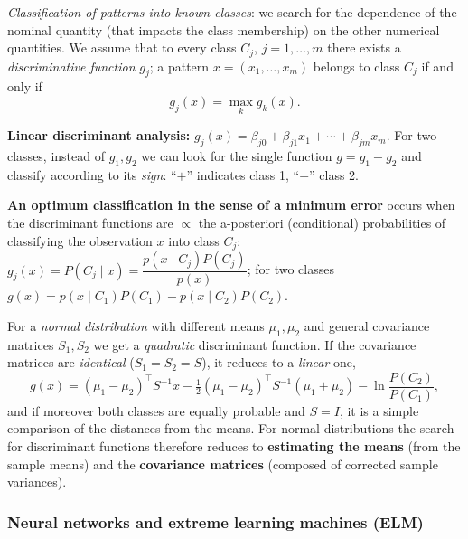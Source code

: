 \documentclass[11pt,a4paper]{article}
\theoremstyle{definition}
\providecommand{\uv}[1]{``#1''}
\begin{document}
\begin{defbox}
\emph{Classification of patterns into known classes}: we search for the dependence of the nominal
quantity (that impacts the class membership) on the other numerical quantities. We assume that to
every class $C_j$, $j=1,\dots,m$ there exists a \emph{discriminative function} $g_j$; a pattern
$x=(x_1,\dots,x_m)$ belongs to class $C_j$ if and only if
\[ g_j(x)=\max_{k} g_k(x). \]

\textbf{Linear discriminant analysis:}
$g_j(x)=\beta_{j0}+\beta_{j1}x_1+\cdots+\beta_{jm}x_m$. For two classes, instead of $g_1,g_2$ we
can look for the single function $g=g_1-g_2$ and classify according to its \emph{sign}: \uv{$+$}
indicates class 1, \uv{$-$} class 2.

\textbf{An optimum classification in the sense of a minimum error} occurs when the discriminant
functions are $\propto$ the a-posteriori (conditional) probabilities of classifying the
observation $x$ into class $C_j$: $g_j(x)=P(C_j\mid x)=\dfrac{p(x\mid C_j)P(C_j)}{p(x)}$; for two
classes $g(x)=p(x\mid C_1)P(C_1)-p(x\mid C_2)P(C_2)$.
\end{defbox}

For a \emph{normal distribution} with different means $\mu_1,\mu_2$ and general covariance
matrices $S_1,S_2$ we get a \emph{quadratic} discriminant function. If the covariance matrices are
\emph{identical} ($S_1=S_2=S$), it reduces to a \emph{linear} one,
\[ g(x)=(\mu_1-\mu_2)^{\!\top}S^{-1}x-\tfrac12(\mu_1-\mu_2)^{\!\top}S^{-1}(\mu_1+\mu_2)
   -\ln\frac{P(C_2)}{P(C_1)}, \]
and if moreover both classes are equally probable and $S=I$, it is a simple comparison of the
distances from the means. For normal distributions the search for discriminant functions therefore
reduces to \textbf{estimating the means} (from the sample means) and the \textbf{covariance
matrices} (composed of corrected sample variances).

\subsubsection{Neural networks and extreme learning machines (ELM)}
\end{document}
